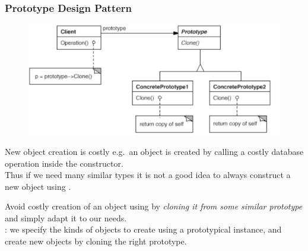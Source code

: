 \subsubsection{Prototype Design Pattern}
\begin{figure}[H]
  \centering
  \includegraphics[width=1.0\columnwidth]{figures/prototypePattern.png}
\end{figure}
\begin{sectionbox}[Problem]\nospacing
  New object creation  is costly e.g.\
  an object is created by calling a costly database operation inside the constructor.\\
  Thus if we need many similar types it is not a good idea to always construct a
  new object using \javainline{new}.
\end{sectionbox}
\begin{intentbox}[Intent]
    Avoid costly creation of an object using  by \textit{cloning
      it from some similar prototype} and simply adapt it to our needs.\\
    \imp{Thus}: we specify the kinds of objects to create using a prototypical
    instance, and create new objects by cloning the right prototype.
\end{intentbox}
